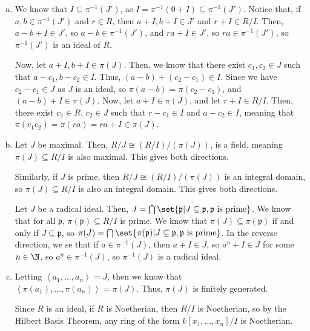 \documentclass[10pt]{mypackage}
\begin{document}
\begin{solution}\hfill
  \begin{enumerate}[(a)]
    \item We know that $I\subseteq \pi^{-1}\left( J' \right)$, as $ I = \pi^{-1}\left(0 + I\right) \subseteq \pi^{-1}\left( J' \right)$. Notice that, if $a,b\in \pi^{-1}\left(J'\right)$ and $r\in R$, then $a + I,b + I\in J'$ and $r + I\in R/I$. Then, $a-b +I\in J'$, so $a-b\in \pi^{-1}\left( J' \right)$, and $ra + I \in J'$, so $ra\in \pi^{-1}\left( J' \right)$, so $\pi^{-1}\left( J' \right)$ is an ideal of $R$.\newline

      Now, let $a+I,b+I\in \pi(J)$. Then, we know that there exist $c_1,c_2\in J$ such that $a-c_1,b-c_2\in I$. Thus, $\left( a-b \right) + \left( c_2 - c_1 \right)\in I$. Since we have $c_2 - c_1\in J$ as $J$ is an ideal, so $\pi\left( a-b \right) = \pi\left( c_2 - c_1 \right)$, and $\left( a-b \right) + I\in \pi(J)$. Now, let $a + I\in \pi(J)$, and let $r + I\in R/I$. Then, there exist $c_1\in R$, $c_2\in J$ such that $r-c_1\in I$ and $a - c_2\in I$, meaning that $\pi\left( c_1c_2 \right) = \pi\left( ra \right) = ra + I \in \pi(J)$.
    \item Let $J$ be maximal. Then, $R/J \cong \left( R/I \right)/\left( \pi(J) \right)$, is a field, meaning $\pi(J)\subseteq R/I$ is also maximal. This gives both directions.\newline

    Similarly, if $J$ is prime, then $R/J \cong \left( R/I \right)/\left( \pi(J) \right)$ is an integral domain, so $\pi(J)\subseteq R/I$ is also an integral domain. This gives both directions.\newline

    Let $J$ be a radical ideal. Then, $J = \bigcap\set{\mathfrak{p} | J\subseteq \mathfrak{p},\mathfrak{p}\text{ is prime}}$. We know that for all $\mathfrak{p}$, $\pi\left( \mathfrak{p} \right)\subseteq R/I$ is prime. We know that $\pi(J)\subseteq \pi\left( \mathfrak{p} \right)$ if and only if $J\subseteq \mathfrak{p}$, so $\pi(J) = \bigcap\set{\pi(\mathfrak{p}) | J\subseteq \mathfrak{p},\mathfrak{p}\text{ is prime}}$. In the reverse direction, we se that if $a\in \pi^{-1}(J)$, then $a + I\in J$, so $a^n + I\in J$ for some $n\in \N$, so $a^n\in \pi^{-1}(J)$, so $\pi^{-1}(J)$ is a radical ideal.
  \item Letting $\left\langle a_1,\dots,a_n \right\rangle = J$, then we know that $ \left\langle \pi\left(a_1\right),\dots,\pi\left(a_n\right) \right\rangle= \pi(J)$. Thus, $\pi(J)$ is finitely generated.\newline

    Since $R$ is an ideal, if $R$ is Noetherian, then $R/I$ is Noetherian, so by the Hilbert Basis Theorem, any ring of the form $k\left[ x_1,\dots,x_n \right]/I$ is Noetherian.
  \end{enumerate}
\end{solution}
\end{document}

